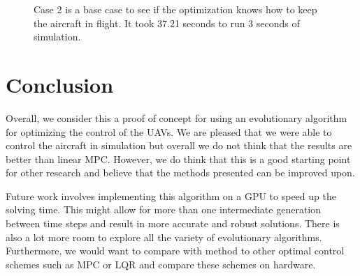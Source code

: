 \documentclass[letterpaper, 10 pt, conference]{ieeeconf}  %
\begin{document}
	
	\begin{figure}[htbp]
		\centering
		\qquad
		\caption{Case 2 is a base case to see if the optimization knows how to keep the aircraft in  flight. It took 37.21 seconds to run 3 seconds of simulation.}
		\label{fig:fw_circle}
	\end{figure}
	
	\section{Conclusion}
	
	Overall, we consider this a proof of concept for using an evolutionary algorithm for optimizing the control of the UAVs. We are pleased that we were able to control the aircraft in simulation but overall we do not think that the results are better than linear MPC. However, we do think that this is a good starting point for other research and believe that the methods presented can be improved upon.
	
	Future work involves implementing this algorithm on a GPU to speed up the solving time. This might allow for more than one intermediate generation between time steps and result in more accurate and robust solutions. There is also a lot more room to explore all the variety of evolutionary algorithms. Furthermore, we would want to compare with method to other optimal control schemes such as MPC or LQR and compare these schemes on hardware. 
	
\end{document}
